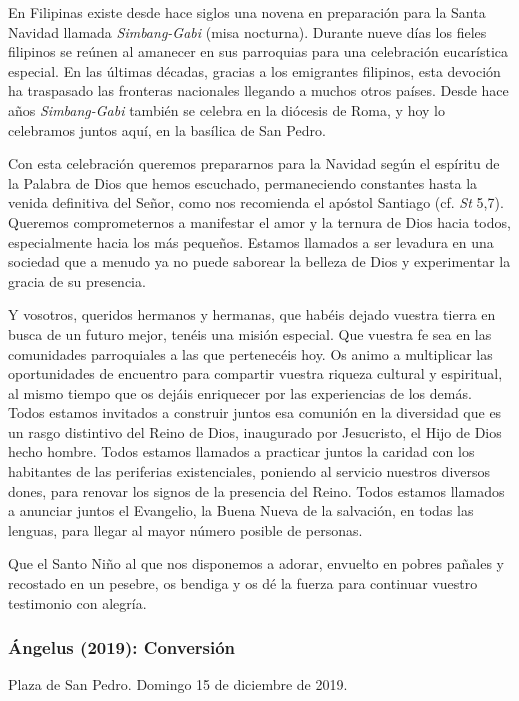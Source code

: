 \begin{body}
\begin{body}
En Filipinas existe desde hace siglos una novena en preparación para la Santa Navidad llamada \emph{Simbang-Gabi} (misa nocturna). Durante nueve días los fieles filipinos se reúnen al amanecer en sus parroquias para una celebración eucarística especial. En las últimas décadas, gracias a los emigrantes filipinos, esta devoción ha traspasado las fronteras nacionales llegando a muchos otros países. Desde hace años \emph{Simbang-Gabi} también se celebra en la diócesis de Roma, y hoy lo celebramos juntos aquí, en la basílica de San Pedro.

Con esta celebración queremos prepararnos para la Navidad según el espíritu de la Palabra de Dios que hemos escuchado, permaneciendo constantes hasta la venida definitiva del Señor, como nos recomienda el apóstol Santiago (cf. \emph{St} 5,7). Queremos comprometernos a manifestar el amor y la ternura de Dios hacia todos, especialmente hacia los más pequeños. Estamos llamados a ser levadura en una sociedad que a menudo ya no puede saborear la belleza de Dios y experimentar la gracia de su presencia.

Y vosotros, queridos hermanos y hermanas, que habéis dejado vuestra tierra en busca de un futuro mejor, tenéis una misión especial. Que vuestra fe sea  en las comunidades parroquiales a las que pertenecéis hoy. Os animo a multiplicar las oportunidades de encuentro para compartir vuestra riqueza cultural y espiritual, al mismo tiempo que os dejáis enriquecer por las experiencias de los demás. Todos estamos invitados a construir juntos esa comunión en la diversidad que es un rasgo distintivo del Reino de Dios, inaugurado por Jesucristo, el Hijo de Dios hecho hombre. Todos estamos llamados a practicar juntos la caridad con los habitantes de las periferias existenciales, poniendo al servicio nuestros diversos dones, para renovar los signos de la presencia del Reino. Todos estamos llamados a anunciar juntos el Evangelio, la Buena Nueva de la salvación, en todas las lenguas, para llegar al mayor número posible de personas.

Que el Santo Niño al que nos disponemos a adorar, envuelto en pobres pañales y recostado en un pesebre, os bendiga y os dé la fuerza para continuar vuestro testimonio con alegría.


\subsubsection{Ángelus (2019): Conversión}

Plaza de San Pedro. Domingo 15 de diciembre de 2019.


\end{body}
\end{body}
